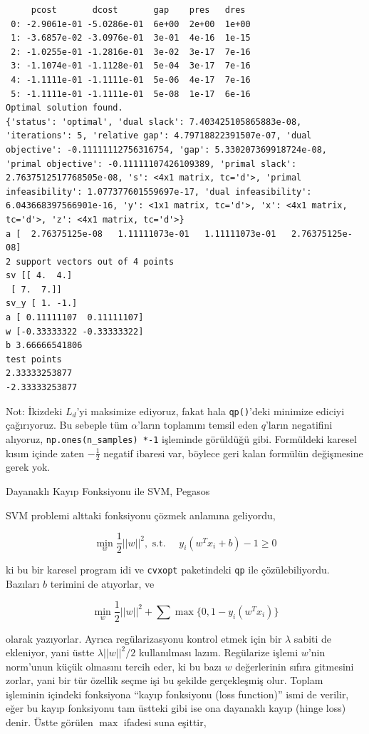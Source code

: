 \documentclass[12pt,fleqn]{article}\usepackage{../../common}
\begin{document}
\begin{verbatim}
     pcost       dcost       gap    pres   dres
 0: -2.9061e-01 -5.0286e-01  6e+00  2e+00  1e+00
 1: -3.6857e-02 -3.0976e-01  3e-01  4e-16  1e-15
 2: -1.0255e-01 -1.2816e-01  3e-02  3e-17  7e-16
 3: -1.1074e-01 -1.1128e-01  5e-04  3e-17  7e-16
 4: -1.1111e-01 -1.1111e-01  5e-06  4e-17  7e-16
 5: -1.1111e-01 -1.1111e-01  5e-08  1e-17  6e-16
Optimal solution found.
{'status': 'optimal', 'dual slack': 7.403425105865883e-08, 'iterations': 5, 'relative gap': 4.79718822391507e-07, 'dual objective': -0.11111112756316754, 'gap': 5.330207369918724e-08, 'primal objective': -0.11111107426109389, 'primal slack': 2.7637512517768505e-08, 's': <4x1 matrix, tc='d'>, 'primal infeasibility': 1.077377601559697e-17, 'dual infeasibility': 6.043668397566901e-16, 'y': <1x1 matrix, tc='d'>, 'x': <4x1 matrix, tc='d'>, 'z': <4x1 matrix, tc='d'>}
a [  2.76375125e-08   1.11111073e-01   1.11111073e-01   2.76375125e-08]
2 support vectors out of 4 points
sv [[ 4.  4.]
 [ 7.  7.]]
sv_y [ 1. -1.]
a [ 0.11111107  0.11111107]
w [-0.33333322 -0.33333322]
b 3.66666541806
test points
2.33333253877
-2.33333253877
\end{verbatim}

Not: İkizdeki $L_d$'yi maksimize ediyoruz, fakat hala \verb!qp()!'deki
minimize ediciyi çağırıyoruz. Bu sebeple tüm $\alpha$'ların toplamını
temsil eden $q$'ların negatifini alıyoruz, \verb!np.ones(n_samples) *-1!
işleminde görüldüğü gibi. Formüldeki karesel kısım içinde zaten
$-\frac{1}{2}$ negatif ibaresi var, böylece geri kalan formülün değişmesine
gerek yok.

Dayanaklı Kayıp Fonksiyonu ile SVM, Pegasos

SVM problemi alttaki fonksiyonu çözmek anlamına geliyordu,

$$ \min_w \frac{1}{2}{||w||^2}, \textrm{ s.t. } \quad y_{i}(w^Tx_{i}+b)-1 \ge 0 $$

ki bu bir karesel program idi ve \verb!cvxopt! paketindeki \verb!qp! ile
çözülebiliyordu. Bazıları $b$ terimini de atıyorlar, ve 

$$  \min_w \frac{1}{2}{||w||^2} + \sum \max \{ 0, 1-y_i (w^T x_i) \}  $$

olarak yazıyorlar. Ayrıca regülarizasyonu kontrol etmek için bir $\lambda$
sabiti de ekleniyor, yani üstte $\lambda ||w||^2 / 2$ kullanılması
lazım. Regülarize işlemi $w$'nin norm'unun küçük olmasını tercih eder, ki bu
bazı $w$ değerlerinin sıfıra gitmesini zorlar, yani bir tür özellik seçme işi bu
şekilde gerçekleşmiş olur. Toplam işleminin içindeki fonksiyona ``kayıp
fonksiyonu (loss function)'' ismi de verilir, eğer bu kayıp fonksiyonu tam
üstteki gibi ise ona dayanaklı kayıp (hinge loss) denir. Üstte görülen $\max$
ifadesi suna eşittir,
\end{document}
